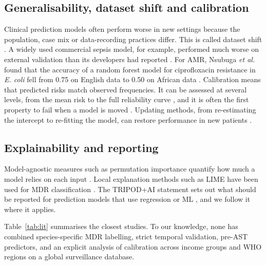 \documentclass[11pt,a4paper]{article}
\newcommand{\sci}[1]{\textit{#1}}
\begin{document}
\subsection{Generalisability, dataset shift and calibration}
Clinical prediction models often perform worse in new settings because the population, case mix or data-recording practices differ. This is called dataset shift \cite{finlayson2021}. A widely used commercial sepsis model, for example, performed much worse on external validation than its developers had reported \cite{wong2021}. For AMR, Nsubuga \textit{et al.} found that the accuracy of a random forest model for ciprofloxacin resistance in \sci{E. coli} fell from 0.75 on English data to 0.50 on African data \cite{nsubuga2024}. Calibration means that predicted risks match observed frequencies. It can be assessed at several levels, from the mean risk to the full reliability curve \cite{vancalster2016}, and it is often the first property to fail when a model is moved \cite{vancalster2019}. Updating methods, from re-estimating the intercept to re-fitting the model, can restore performance in new patients \cite{janssen2008,steyerberg2019}.

\subsection{Explainability and reporting}
Model-agnostic measures such as permutation importance quantify how much a model relies on each input \cite{breiman2001,fisher2019}. Local explanation methods such as LIME have been used for MDR classification \cite{wishal2026}. The TRIPOD+AI statement sets out what should be reported for prediction models that use regression or ML \cite{collins2024}, and we follow it where it applies.

Table~\ref{tab:lit} summarises the closest studies. To our knowledge, none has combined species-specific MDR labelling, strict temporal validation, pre-AST predictors, and an explicit analysis of calibration across income groups and WHO regions on a global surveillance database.
\end{document}
